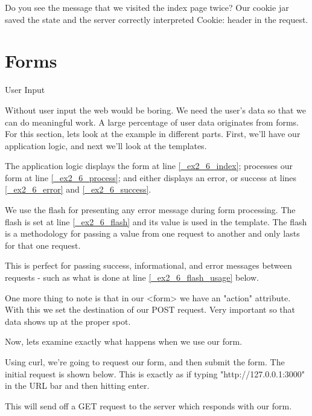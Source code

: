 \documentclass[14pt]{extreport}
\begin{document}
Do you see the message that we visited the index page twice?  Our cookie jar
saved the state and the server correctly interpreted Cookie: header in the
request.

\section{Forms}

{\Large User Input}

Without user input the web would be boring.  We need the user's data so that we
can do meaningful work.  A large percentage of user data originates from forms.
For this section, lets look at the example in different parts.  First, we'll
have our application logic, and next we'll look at the templates.

The application logic displays the form at line \ref{_ex2_6_index}; processes
our form at line \ref{_ex2_6_process}; and either displays an error, or success
at lines \ref{_ex2_6_error} and \ref{_ex2_6_success}.



We use the flash for presenting any error message during form processing.  The
flash is set at line \ref{_ex2_6_flash} and its value is used in the template.
The flash is a methodology for passing a value from one request to another and
only lasts for that one request.

This is perfect for passing success, informational, and error messages between
requests - such as what is done at line \ref{_ex2_6_flash_usage} below.

One more thing to note is that in our <form> we have an "action" attribute.
With this we set the destination of our POST request.  Very important so that
data shows up at the proper spot.

\clearpage



Now, lets examine exactly what happens when we use our form. 

Using curl, we're going to request our form, and then submit the form.  The initial
request is shown below.  This is exactly as if typing "http://127.0.0.1:3000" in the
URL bar and then hitting enter.

This will send off a GET request to the server which responds with our form.
\end{document}

